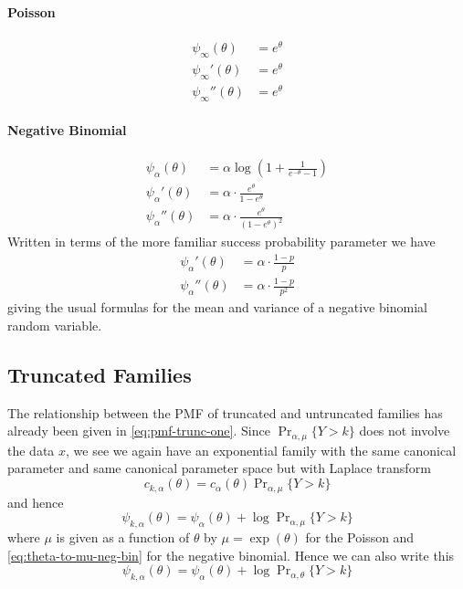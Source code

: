 \documentclass[11pt]{article}
\newcommand{\Prsub}[1]{\Pr\nolimits_{#1}}
\begin{document}
\paragraph{Poisson}

\begin{subequations}
\begin{align}
   \psi_\infty(\theta) & = e^\theta
   \label{eq:cum-fun-pois}
   \\
   \psi_\infty'(\theta) & = e^\theta
   \\
   \psi_\infty''(\theta) & = e^\theta
   \label{eq:cum-fun-pp-pois}
\end{align}
\end{subequations}

\paragraph{Negative Binomial}

\begin{subequations}
\begin{align}
   \psi_\alpha(\theta) & = 
   \alpha \log \left(1 + \frac{1}{e^{- \theta} - 1} \right)
   \label{eq:cum-fun-neg-bin}
   \\
   \psi_\alpha'(\theta) & = \alpha \cdot \frac{e^\theta}{1 - e^\theta}
   \\
   \psi_\alpha''(\theta) & = \alpha \cdot \frac{e^\theta}{(1 - e^\theta)^2}
   \label{eq:cum-fun-pp-neg-bin}
\end{align}
\end{subequations}
Written in terms of the more familiar success probability parameter
we have
\begin{align*}
   \psi_\alpha'(\theta) & = \alpha \cdot \frac{1 - p}{p}
   \\
   \psi_\alpha''(\theta) & = \alpha \cdot \frac{1 - p}{p^2}
\end{align*}
giving the usual formulas for the mean and variance of a negative
binomial random variable.

\subsection{Truncated Families}

The relationship between the PMF of truncated and untruncated families
has already been given in \eqref{eq:pmf-trunc-one}.
Since $\Prsub{\alpha, \mu}\{Y > k\}$ does not involve the data $x$,
we see we again have an exponential family with the same canonical parameter
and same canonical parameter space but with Laplace transform
$$
   c_{k, \alpha}(\theta) = c_\alpha(\theta) \Prsub{\alpha, \mu}\{Y > k\}
$$
and hence
\begin{equation*}
   \psi_{k, \alpha}(\theta)
   =
   \psi_\alpha(\theta)
   +
   \log \Prsub{\alpha, \mu}\{Y > k\}
\end{equation*}
where $\mu$ is given as a function of $\theta$ by
$\mu = \exp(\theta)$ for the Poisson and
\eqref{eq:theta-to-mu-neg-bin} for the negative binomial.
Hence we can also write this
\begin{equation} \label{eq:cum-funk}
   \psi_{k, \alpha}(\theta)
   =
   \psi_\alpha(\theta)
   +
   \log \Prsub{\alpha, \theta}\{Y > k\}
\end{equation}
\end{document}
